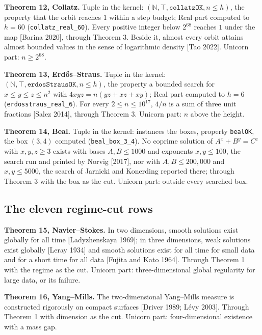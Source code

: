 \documentclass[10pt,twocolumn]{article}
\begin{document}
\textbf{Theorem 12, Collatz.} Tuple in the kernel:
\((\mathbb{N}, \top, \texttt{collatzOK}, n \le h)\), the property that
the orbit reaches \(1\) within a step budget; Real part computed to
\(h = 60\) (\texttt{collatz\_real\_60}). Every positive integer below
\(2^{68}\) reaches \(1\) under the map {[}Barina 2020{]}, through
Theorem 3. Beside it, almost every orbit attains almost bounded values
in the sense of logarithmic density {[}Tao 2022{]}. Unicorn part:
\(n \ge 2^{68}\).

\textbf{Theorem 13, Erdős--Straus.} Tuple in the kernel:
\((\mathbb{N}, \top, \texttt{erdosStrausOK}, n \le h)\), the property a
bounded search for \(x \le y \le z \le n^2\) with
\(4xyz = n(yz + xz + xy)\); Real part computed to \(h = 6\)
(\texttt{erdosstraus\_real\_6}). For every \(2 \le n \le 10^{17}\),
\(4/n\) is a sum of three unit fractions {[}Salez 2014{]}, through
Theorem 3. Unicorn part: \(n\) above the height.

\textbf{Theorem 14, Beal.} Tuple in the kernel: instances the boxes,
property \texttt{bealOK}, the box \((3, 4)\) computed
(\texttt{beal\_box\_3\_4}). No coprime solution of \(A^x + B^y = C^z\)
with \(x, y, z \ge 3\) exists with bases \(A, B \le 1000\) and exponents
\(x, y \le 100\), the search run and printed by Norvig {[}2017{]}, nor
with \(A, B \le 200{,}000\) and \(x, y \le 5000\), the search of
Jarnicki and Konerding reported there; through Theorem 3 with the box as
the cut. Unicorn part: outside every searched box.

\hypertarget{the-eleven-regime-cut-rows}{%
\subsection{The eleven regime-cut
rows}\label{the-eleven-regime-cut-rows}}

\textbf{Theorem 15, Navier--Stokes.} In two dimensions, smooth solutions
exist globally for all time {[}Ladyzhenskaya 1969{]}; in three
dimensions, weak solutions exist globally {[}Leray 1934{]} and smooth
solutions exist for all time for small data and for a short time for all
data {[}Fujita and Kato 1964{]}. Through Theorem 1 with the regime as
the cut. Unicorn part: three-dimensional global regularity for large
data, or its failure.

\textbf{Theorem 16, Yang--Mills.} The two-dimensional Yang--Mills
measure is constructed rigorously on compact surfaces {[}Driver 1989;
Lévy 2003{]}. Through Theorem 1 with dimension as the cut. Unicorn part:
four-dimensional existence with a mass gap.
\end{document}
